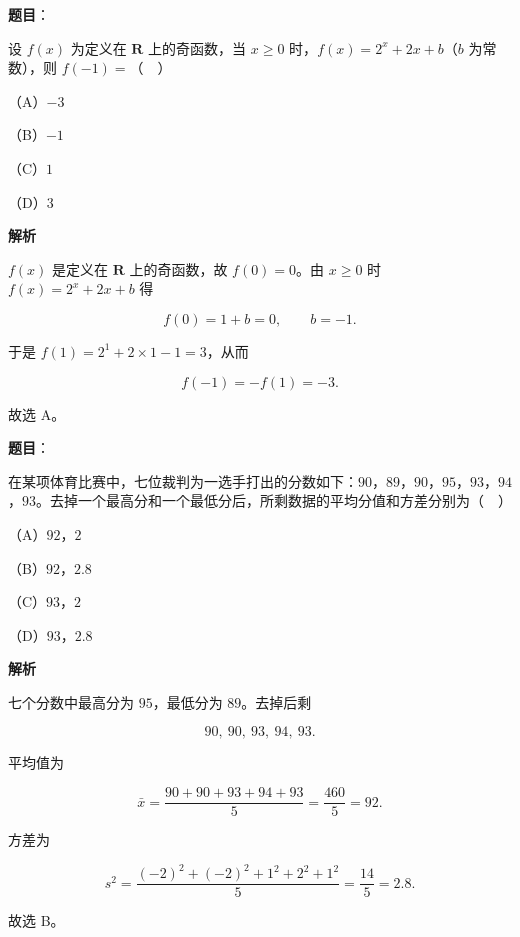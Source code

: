 \begin{answer}

\textbf{题目}：

设 $f(x)$ 为定义在 $\mathbf R$ 上的奇函数，当 $x\geqslant0$ 时，$f(x)=2^x+2x+b$（$b$ 为常数），则 $f(-1)=$（　）

（A）$-3$

（B）$-1$

（C）$1$

（D）$3$

\textbf{解析}

$f(x)$ 是定义在 $\mathbf R$ 上的奇函数，故 $f(0)=0$。由 $x\geqslant0$ 时 $f(x)=2^x+2x+b$ 得

\nopagebreak[4]
\[f(0)=1+b=0,\qquad b=-1.\]

于是 $f(1)=2^1+2\times1-1=3$，从而

\nopagebreak[4]
\[f(-1)=-f(1)=-3.\]

故选 A。


\end{answer}
\begin{answer}

\textbf{题目}：

在某项体育比赛中，七位裁判为一选手打出的分数如下：$90$，$89$，$90$，$95$，$93$，$94$，$93$。去掉一个最高分和一个最低分后，所剩数据的平均分值和方差分别为（　）

（A）$92$，$2$

（B）$92$，$2.8$

（C）$93$，$2$

（D）$93$，$2.8$

\textbf{解析}

七个分数中最高分为 $95$，最低分为 $89$。去掉后剩

\nopagebreak[4]
\[90,\ 90,\ 93,\ 94,\ 93.\]

平均值为

\nopagebreak[4]
\[\bar x=\frac{90+90+93+94+93}{5}=\frac{460}{5}=92.\]

方差为

\nopagebreak[4]
\[s^2=\frac{(-2)^2+(-2)^2+1^2+2^2+1^2}{5}=\frac{14}{5}=2.8.\]

故选 B。


\end{answer}
